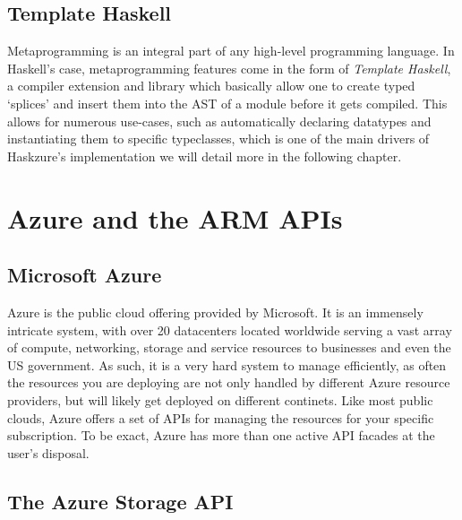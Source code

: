 \documentclass[11pt]{report}
\begin{document}
\subsection{Template Haskell}

Metaprogramming is an integral part of any high-level programming language. In
Haskell's case, metaprogramming features come in the form of \textit{Template
Haskell}, a compiler extension and library which basically allow one to create
typed `splices' and insert them into the AST of a module before it gets
compiled. This allows for numerous use-cases, such as automatically declaring
datatypes and instantiating them to specific typeclasses, which is one of the
main drivers of Haskzure's implementation we will detail more in the following
chapter.


\section{Azure and the ARM APIs}

\subsection{Microsoft Azure}

Azure is the public cloud offering provided by Microsoft. It is an immensely
intricate system, with over 20 datacenters located worldwide serving a vast
array of compute, networking, storage and service resources to businesses and
even the US government. As such, it is a very hard system to manage
efficiently, as often the resources you are deploying are not only handled by
different Azure resource providers, but will likely get deployed on different
continets. \newline
Like most public clouds, Azure offers a set of APIs for managing the resources
for your specific subscription. To be exact, Azure has more than one active API
facades at the user's disposal.

\subsection{The Azure Storage API}
\end{document}
